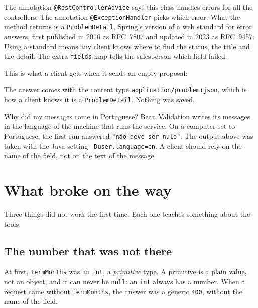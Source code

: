 The annotation \texttt{@RestControllerAdvice} says this class handles errors
for all the controllers. The annotation \texttt{@ExceptionHandler} picks which
error. What the method returns is a
\texttt{ProblemDetail}, Spring's version of a web standard for error answers,
first published in 2016 as RFC~7807 and updated in 2023 as RFC~9457. Using a
standard means any client knows where to find the status, the title and the
detail. The extra \texttt{fields} map tells the salesperson which field
failed.

This is what a client gets when it sends an empty proposal:


The answer comes with the content type \texttt{application/problem+json},
which is how a client knows it is a \texttt{ProblemDetail}. Nothing was saved.

\begin{question}{Why did my messages come in Portuguese?}
Bean Validation writes its messages in the language of the machine that runs
the service. On a computer set to Portuguese, the first run answered
\texttt{"não deve ser nulo"}. The output above was taken with the Java
setting \texttt{-Duser.language=en}. A client should rely on the name of the
field, not on the text of the message.
\end{question}

\section{What broke on the way}

Three things did not work the first time. Each one teaches something about
the tools.

\subsection*{The number that was not there}

At first, \texttt{termMonths} was an \texttt{int}, a
\emph{primitive} type. A primitive is a plain value, not an object, and it
can never be \texttt{null}: an \texttt{int} always has a number. When a
request came without \texttt{termMonths}, the answer was a generic
\texttt{400}, without the name of the field.

